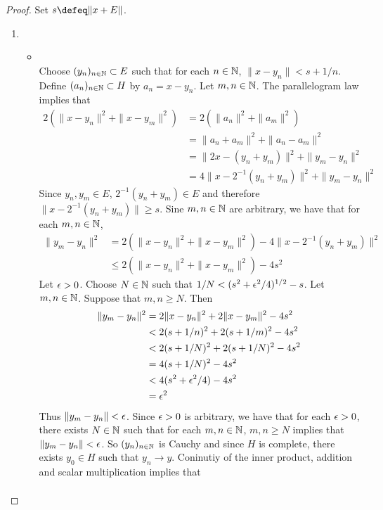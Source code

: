 \documentclass{book}
\begin{document}
\begin{proof} Set $s \defeq \|x+E\|$.
	\begin{enumerate}
		\item \begin{itemize}
			\item {} \\
			Choose $(y_n)_{n \in \mathbb{N}} \subset E$ such that for each $n \in \mathbb{N}$, $\|x - y_n\| < s + 1/n$. Define $(a_n)_{n \in \mathbb{N}} \subset H$ by $a_n = x - y_n$. Let $m,n \in \mathbb{N}$. The parallelogram law implies that
			\begin{align*}
				2(\|x - y_n\|^2 + \|x-y_m\|^2)
				& = 2 (\|a_n\|^2 + \|a_m\|^2) \\
				& = \|a_n + a_m\|^2 + \|a_n - a_m\|^2 \\
				& = \|2x - (y_n + y_m)\|^2 +  \|y_m - y_n\|^2  \\
				& = 4 \|x - 2^{-1}(y_n + y_m)\|^2 +  \|y_m - y_n\|^2
			\end{align*}
			Since $y_n,y_m \in E$, $2^{-1}(y_n + y_m) \in E$ and therefore $\|x - 2^{-1}(y_n + y_m)\| \geq s$. Sine $m,n \in \mathbb{N}$ are arbitrary, we have that for each $m,n \in \mathbb{N}$, 
			\begin{align*}
				\|y_m - y_n\|^2  
				& = 2(\|x - y_n\|^2 + \|x-y_m\|^2) - 4 \|x - 2^{-1}(y_n + y_m)\|^2 \\
				& \leq 2(\|x - y_n\|^2 + \|x-y_m\|^2) - 4s^2 
			\end{align*}
			Let $\epsilon > 0$. Choose $N \in \mathbb{N}$ such that $1/N < (s^2 + \epsilon^2/4)^{1/2} - s$. Let $m,n \in \mathbb{N}$. Suppose that $m,n \geq N$. Then 
			\begin{align*}
				\|y_m - y_n\|^2
				& = 2\|x - y_n\|^2 + 2\|x-y_m\|^2 - 4s^2 \\
				& < 2(s + 1/n)^2 + 2(s + 1/m)^2 -4s^2 \\
				& < 2(s + 1/N)^2 + 2(s + 1/N)^2 -4s^2 \\
				& = 4(s + 1/N)^2 -4s^2 \\
				& < 4(s^2 + \epsilon^2/4) - 4s^2 \\
				& = \epsilon^2 
			\end{align*}
			Thus $\|y_m - y_n\| < \epsilon$. Since $\epsilon > 0$ is arbitrary, we have that for each $\epsilon > 0$, there exists $N \in \mathbb{N}$ such that for each $m,n \in \mathbb{N}$, $m,n \geq N$ implies that $\|y_m - y_n\| < \epsilon$. So $(y_n)_{n \in \mathbb{N}}$ is Cauchy and since $H$ is complete, there exists $y_0 \in H$ such that $y_n \rightarrow y$. Coninutiy of the inner product, addition and scalar multiplication implies that
			\begin{align*}

\end{align*}
\end{itemize}
\end{enumerate}
\end{proof}
\end{document}

